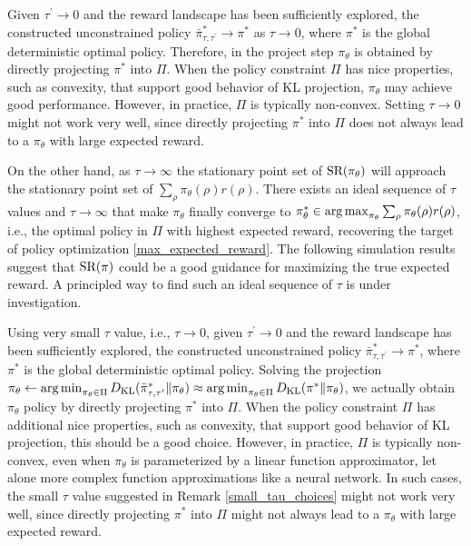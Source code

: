 Given $\tau^{\prime} \to 0$ and the reward landscape has been sufficiently explored,
the constructed unconstrained policy $\bar{\pi}_{\tau,\tau^{\prime}}^* \to \pi^*$ as $\tau \to 0$, where $\pi^*$ is the global deterministic optimal policy. 
Therefore, in the project step $\pi_\theta$ is obtained by directly projecting $\pi^*$ into $\Pi$. When the policy constraint $\Pi$ has nice properties, such as convexity, that support good behavior of KL projection, $\pi_\theta$ may achieve good performance.
However, in practice, $\Pi$ is typically non-convex. Setting $\tau \to 0$ might not work very well, since directly projecting $\pi^*$ into $\Pi$ does not always lead to a $\pi_\theta$ with large expected reward.

On the other hand, as $\tau \to \infty$ the stationary point set of $\text{SR}(\pi_\theta)$ will approach the stationary point set of $\sum_{\rho}{ \pi_\theta(\rho) r(\rho) }$.
There exists an ideal sequence of $\tau$ values and $\tau \to \infty$ that make $\pi_\theta$ finally converge to $\pi_\theta^* \in \operatorname*{arg\,max}_{\pi_\theta}{ \sum_{\rho}{\pi_\theta(\rho) r(\rho)} }$, i.e., the optimal policy in $\Pi$ with highest expected reward, recovering the target of policy optimization \cref{max_expected_reward}. 
The following simulation results suggest that $\text{SR}(\pi)$ could be a good guidance for maximizing the true expected reward.
A principled way to find such an ideal sequence of $\tau$ is under investigation.

Using very small $\tau$ value, i.e., $\tau \to 0$, given $\tau^{\prime} \to 0$ and the reward landscape has been sufficiently explored, the constructed unconstrained policy $\bar{\pi}_{\tau,\tau^{\prime}}^* \to \pi^*$, where $\pi^*$ is the global deterministic optimal policy. Solving the projection $\pi_\theta \leftarrow \operatorname*{arg\,min}_{\pi_\theta \in \Pi}{D_{\mathrm{KL}}(\bar{\pi}_{\tau,\tau^{\prime}}^* \| \pi_\theta}) \approx \operatorname*{arg\,min}_{\pi_\theta \in \Pi}{D_{\mathrm{KL}}(\pi^* \| \pi_\theta})$, we actually obtain $\pi_\theta$ policy by directly projecting $\pi^*$ into $\Pi$. When the policy constraint $\Pi$ has additional nice properties, such as convexity, that support good behavior of KL projection, this should be a good choice.
However, in practice, $\Pi$ is typically non-convex, even when $\pi_\theta$ is parameterized by a linear function approximator, let alone more complex function approximations like a neural network. In such cases, the small $\tau$ value suggested in Remark \ref{small_tau_choices} might not work very well, since directly projecting $\pi^*$ into $\Pi$ might not always lead to a $\pi_\theta$ with large expected reward.

